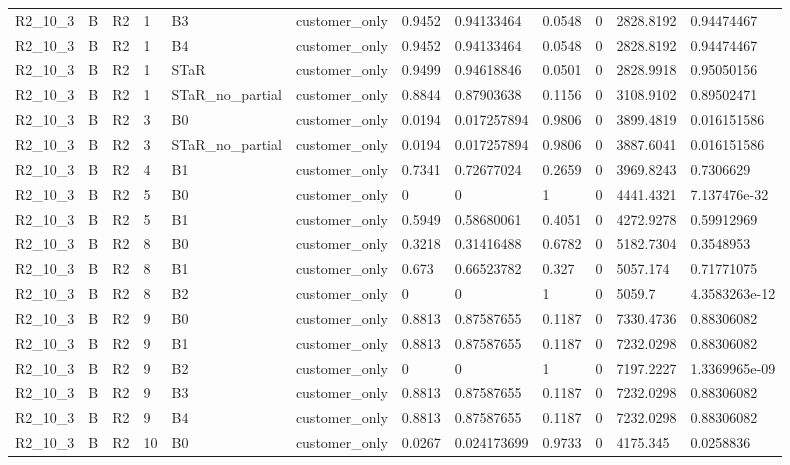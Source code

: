 \begin{longtable}{llllllllllll}
R2\_10\_3 & B & R2 & 1 & B3 & customer\_only & 0.9452 & 0.94133464 & 0.0548 & 0 & 2828.8192 & 0.94474467 \\
R2\_10\_3 & B & R2 & 1 & B4 & customer\_only & 0.9452 & 0.94133464 & 0.0548 & 0 & 2828.8192 & 0.94474467 \\
R2\_10\_3 & B & R2 & 1 & STaR & customer\_only & 0.9499 & 0.94618846 & 0.0501 & 0 & 2828.9918 & 0.95050156 \\
R2\_10\_3 & B & R2 & 1 & STaR\_no\_partial & customer\_only & 0.8844 & 0.87903638 & 0.1156 & 0 & 3108.9102 & 0.89502471 \\
R2\_10\_3 & B & R2 & 3 & B0 & customer\_only & 0.0194 & 0.017257894 & 0.9806 & 0 & 3899.4819 & 0.016151586 \\
R2\_10\_3 & B & R2 & 3 & STaR\_no\_partial & customer\_only & 0.0194 & 0.017257894 & 0.9806 & 0 & 3887.6041 & 0.016151586 \\
R2\_10\_3 & B & R2 & 4 & B1 & customer\_only & 0.7341 & 0.72677024 & 0.2659 & 0 & 3969.8243 & 0.7306629 \\
R2\_10\_3 & B & R2 & 5 & B0 & customer\_only & 0 & 0 & 1 & 0 & 4441.4321 & 7.137476e-32 \\
R2\_10\_3 & B & R2 & 5 & B1 & customer\_only & 0.5949 & 0.58680061 & 0.4051 & 0 & 4272.9278 & 0.59912969 \\
R2\_10\_3 & B & R2 & 8 & B0 & customer\_only & 0.3218 & 0.31416488 & 0.6782 & 0 & 5182.7304 & 0.3548953 \\
R2\_10\_3 & B & R2 & 8 & B1 & customer\_only & 0.673 & 0.66523782 & 0.327 & 0 & 5057.174 & 0.71771075 \\
R2\_10\_3 & B & R2 & 8 & B2 & customer\_only & 0 & 0 & 1 & 0 & 5059.7 & 4.3583263e-12 \\
R2\_10\_3 & B & R2 & 9 & B0 & customer\_only & 0.8813 & 0.87587655 & 0.1187 & 0 & 7330.4736 & 0.88306082 \\
R2\_10\_3 & B & R2 & 9 & B1 & customer\_only & 0.8813 & 0.87587655 & 0.1187 & 0 & 7232.0298 & 0.88306082 \\
R2\_10\_3 & B & R2 & 9 & B2 & customer\_only & 0 & 0 & 1 & 0 & 7197.2227 & 1.3369965e-09 \\
R2\_10\_3 & B & R2 & 9 & B3 & customer\_only & 0.8813 & 0.87587655 & 0.1187 & 0 & 7232.0298 & 0.88306082 \\
R2\_10\_3 & B & R2 & 9 & B4 & customer\_only & 0.8813 & 0.87587655 & 0.1187 & 0 & 7232.0298 & 0.88306082 \\
R2\_10\_3 & B & R2 & 10 & B0 & customer\_only & 0.0267 & 0.024173699 & 0.9733 & 0 & 4175.345 & 0.0258836 \\

\end{longtable}
